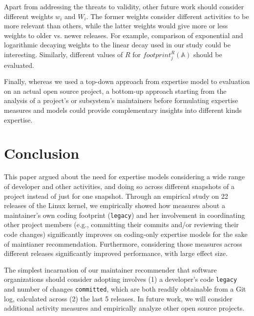 Apart from addressing the threats to validity, other future work should consider different weights $w_i$ and $W_i$. The former weights consider different activities to be more relevant than others, while the latter weights would give more or less weights to older vs. newer releases. For example, comparison of exponential and logarithmic decaying weights to the linear decay used in our study could be interesting. Similarly, different values of $R$ for $footprint_j^R(\mathbb{A})$ should be evaluated.




Finally, whereas we used a top-down approach from expertise model to evaluation on an actual open source project, a bottom-up approach starting from the analysis of a project's or subsystem's maintainers before formulating expertise measures and models could provide complementary insights into different kinds expertise.




\section{Conclusion}

This paper argued about the need for expertise models considering a wide range of developer and other activities, and doing so across different snapshots of a project instead of just for one snapshot. Through an empirical study on 22 releases of the Linux kernel, we empirically showed how measures about a maintainer's own coding footprint (\texttt{legacy}) and her involvement in coordinating other project members (e.g., committing their commits and/or reviewing their code changes) significantly improves on coding-only expertise models for the sake of maintianer recommendation. Furthermore, considering those measures across different releases significantly improved performance, with large effect size.

The simplest incarnation of our maintainer recommender that software organizations should consider adopting involves (1) a developer's code \texttt{legacy} and number of changes \texttt{committed}, which are both readily obtainable from a Git log, calculated across (2) the last 5 releases. In future work, we will consider additional activity measures and empirically analyze other open source projects.




